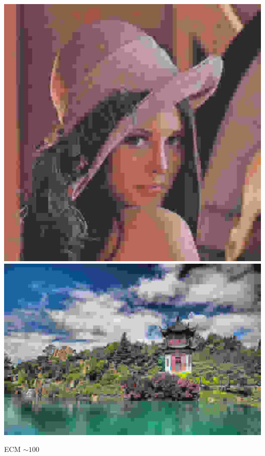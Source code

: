 \documentclass{beamer}
\begin{document}
\begin{frame}
    \begin{center}

        \hfill
        \includegraphics[scale=0.2]{fig/lena_80.png}
        \hfill
        \includegraphics[scale=0.2]{fig/paisaje_80.png}
        \hfill

        \vfill
        {\small ECM $\sim 100$}

    \end{center}
\end{frame}
\end{document}
